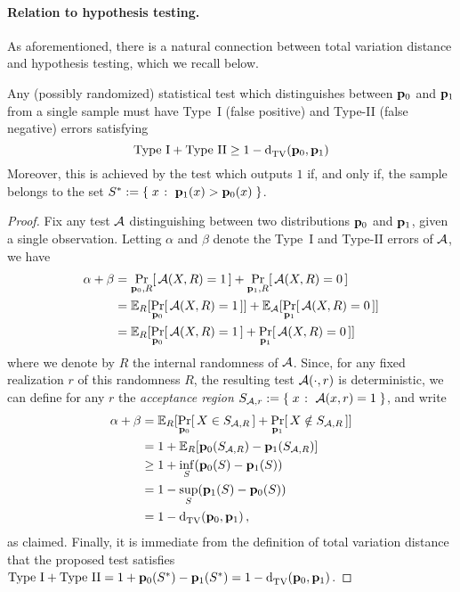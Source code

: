 \paragraph{Relation to hypothesis testing.} As aforementioned, there is a natural connection between total variation distance and hypothesis testing, which we recall below. 
\begin{lemma}
  \label{lemma:pearsonneyman}
  Any (possibly randomized) statistical test which distinguishes between $\mathbf{p}_0$ and $\mathbf{p}_1$ from a single sample must have Type~I (false positive) and Type-II (false negative) errors satisfying
  \[
      \text{Type~I} + \text{Type~II} \geq 1- \totalvardist{\p_0}{\p_1}
  \]
  Moreover, this is achieved by the test which outputs $1$ if, and only if, the sample belongs to the set $S^\ast \eqdef \setOfSuchThat{x}{\p_1(x) > \p_0(x)}$.
\end{lemma}
\begin{proof}
Fix any test $\mathcal{A}$ distinguishing between two distributions $\mathbf{p}_0$ and $\mathbf{p}_1$, given a single observation. Letting $\alpha$ and $\beta$ denote the Type~I and Type-II errors of $\mathcal{A}$, we have
\begin{align*}
  \alpha+\beta 
  &= \probaDistrOf{\p_0,R}{\Algo(X,R)=1} + \probaDistrOf{\p_1,R}{\Algo(X,R)=0} \\
  &= \shortexpect_{R}[ \probaDistrOf{\p_0}{\Algo(X,R)=1} ] + \shortexpect_{\Algo}[ \probaDistrOf{\p_1}{\Algo(X,R)=0} ] \\
  &= \shortexpect_{R}[ \probaDistrOf{\p_0}{\Algo(X,R)=1} + \probaDistrOf{\p_1}{\Algo(X,R)=0} ]
\end{align*}
where we denote by $R$ the internal randomness of $\mathcal{A}$. Since, for any fixed realization $r$ of this randomness $R$, the resulting test $\mathcal{A}(\cdot,r)$ is deterministic, we can define for any $r$ the \emph{acceptance region} $S_{\Algo,r} \eqdef \setOfSuchThat{x}{\Algo(x,r)=1}$, and write
\begin{align*}
  \alpha+\beta 
  &= \shortexpect_{R}[ \probaDistrOf{\p_0}{X \in S_{\Algo,R}} + \probaDistrOf{\p_1}{X \notin S_{\Algo,R}} ] \\
  &= 1+\shortexpect_{R}[ \p_0(S_{\Algo,R}) - \p_1(S_{\Algo,R}) ] \\
  &\geq 1 + \inf_{S}(\p_0(S) - \p_1(S)) \\
  &= 1 - \sup_{S}(\p_1(S) - \p_0(S)) \\
  &= 1- \totalvardist{\p_0}{\p_1}\,,
\end{align*}
as claimed. Finally, it is immediate from the definition of total variation distance that the proposed test satisfies $\text{Type~I} + \text{Type~II} = 1 + \p_0(S^\ast) - \p_1(S^\ast) = 1- \totalvardist{\p_0}{\p_1}$.
\end{proof}
